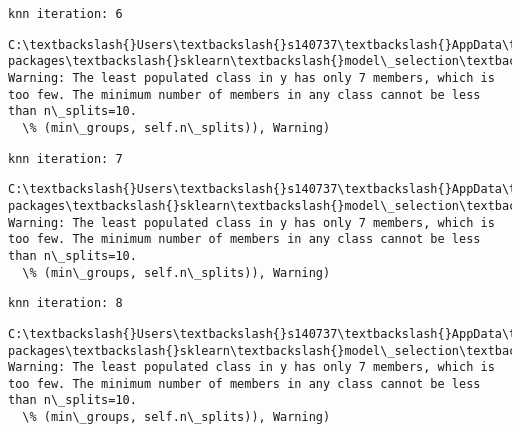 \documentclass[11pt]{article}
\begin{document}
    \begin{Verbatim}[commandchars=\\\{\}]
knn iteration: 6 

    \end{Verbatim}

    \begin{Verbatim}[commandchars=\\\{\}]
C:\textbackslash{}Users\textbackslash{}s140737\textbackslash{}AppData\textbackslash{}Local\textbackslash{}Continuum\textbackslash{}anaconda3\textbackslash{}lib\textbackslash{}site-packages\textbackslash{}sklearn\textbackslash{}model\_selection\textbackslash{}\_split.py:605: Warning: The least populated class in y has only 7 members, which is too few. The minimum number of members in any class cannot be less than n\_splits=10.
  \% (min\_groups, self.n\_splits)), Warning)

    \end{Verbatim}

    \begin{Verbatim}[commandchars=\\\{\}]
knn iteration: 7 

    \end{Verbatim}

    \begin{Verbatim}[commandchars=\\\{\}]
C:\textbackslash{}Users\textbackslash{}s140737\textbackslash{}AppData\textbackslash{}Local\textbackslash{}Continuum\textbackslash{}anaconda3\textbackslash{}lib\textbackslash{}site-packages\textbackslash{}sklearn\textbackslash{}model\_selection\textbackslash{}\_split.py:605: Warning: The least populated class in y has only 7 members, which is too few. The minimum number of members in any class cannot be less than n\_splits=10.
  \% (min\_groups, self.n\_splits)), Warning)

    \end{Verbatim}

    \begin{Verbatim}[commandchars=\\\{\}]
knn iteration: 8 

    \end{Verbatim}

    \begin{Verbatim}[commandchars=\\\{\}]
C:\textbackslash{}Users\textbackslash{}s140737\textbackslash{}AppData\textbackslash{}Local\textbackslash{}Continuum\textbackslash{}anaconda3\textbackslash{}lib\textbackslash{}site-packages\textbackslash{}sklearn\textbackslash{}model\_selection\textbackslash{}\_split.py:605: Warning: The least populated class in y has only 7 members, which is too few. The minimum number of members in any class cannot be less than n\_splits=10.
  \% (min\_groups, self.n\_splits)), Warning)

    \end{Verbatim}
\end{document}
